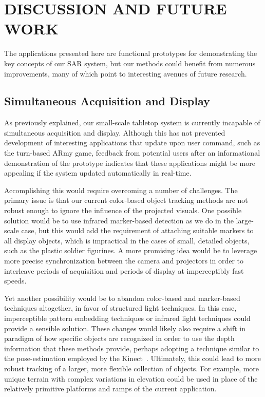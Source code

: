 \documentclass{thesis}
\begin{document}
\chapter{DISCUSSION AND FUTURE WORK}

The applications presented here are functional prototypes for demonstrating the key concepts of our SAR system, but our methods could benefit from numerous improvements, many of which point to interesting avenues of future research.

\section{Simultaneous Acquisition and Display}

As previously explained, our small-scale tabletop system is currently incapable of simultaneous acquisition and display. Although this has not prevented development of interesting applications that update upon user command, such as the turn-based ARmy game, feedback from potential users after an informational demonstration of the prototype indicates that these applications might be more appealing if the system updated automatically in real-time. %

Accomplishing this would require overcoming a number of challenges. The primary issue is that our current color-based object tracking methods are not robust enough to ignore the influence of the projected visuals. One possible solution would be to use infrared marker-based detection as we do in the large-scale case, but this would add the requirement of attaching suitable markers to all display objects, which is impractical in the cases of small, detailed objects, such as the plastic soldier figurines. A more promising idea would be to leverage more precise synchronization between the camera and projectors in order to interleave periods of acquisition and periods of display at imperceptibly fast speeds.

Yet another possibility would be to abandon color-based and marker-based techniques altogether, in favor of structured light techniques. In this case, imperceptible pattern embedding techniques or infrared light techniques could provide a sensible solution. These changes would likely also require a shift in paradigm of how specific objects are recognized in order to use the depth information that these methods provide, perhaps adopting a technique similar to the pose-estimation employed by the Kinect~\cite{Kinect, Shotton2011}. Ultimately, this could lead to more robust tracking of a larger, more flexible collection of objects. For example, more unique terrain with complex variations in elevation could be used in place of the relatively primitive platforms and ramps of the current application.
\end{document}

